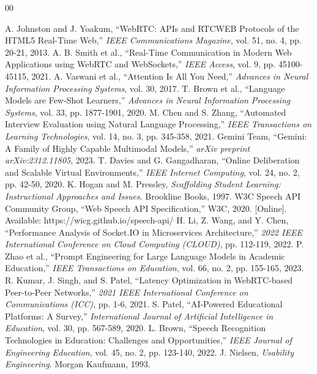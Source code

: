 \documentclass[conference]{IEEEtran}
\begin{document}
\begin{thebibliography}{00}

 A. Johnston and J. Yoakum, ``WebRTC: APIs and RTCWEB Protocols of the HTML5 Real-Time Web,'' \emph{IEEE Communications Magazine}, vol. 51, no. 4, pp. 20-21, 2013.
 A. B. Smith et al., ``Real-Time Communication in Modern Web Applications using WebRTC and WebSockets,'' \emph{IEEE Access}, vol. 9, pp. 45100-45115, 2021.
 A. Vaswani et al., ``Attention Is All You Need,'' \emph{Advances in Neural Information Processing Systems}, vol. 30, 2017.
 T. Brown et al., ``Language Models are Few-Shot Learners,'' \emph{Advances in Neural Information Processing Systems}, vol. 33, pp. 1877-1901, 2020.
 M. Chen and S. Zhang, ``Automated Interview Evaluation using Natural Language Processing,'' \emph{IEEE Transactions on Learning Technologies}, vol. 14, no. 3, pp. 345-358, 2021.
 Gemini Team, ``Gemini: A Family of Highly Capable Multimodal Models,'' \emph{arXiv preprint arXiv:2312.11805}, 2023.
 T. Davies and G. Gangadharan, ``Online Deliberation and Scalable Virtual Environments,'' \emph{IEEE Internet Computing}, vol. 24, no. 2, pp. 42-50, 2020.
 K. Hogan and M. Pressley, \emph{Scaffolding Student Learning: Instructional Approaches and Issues}. Brookline Books, 1997.
 W3C Speech API Community Group, ``Web Speech API Specification,'' W3C, 2020. [Online]. Available: https://wicg.github.io/speech-api/
 H. Li, Z. Wang, and Y. Chen, ``Performance Analysis of Socket.IO in Microservices Architecture,'' \emph{2022 IEEE International Conference on Cloud Computing (CLOUD)}, pp. 112-119, 2022.
 P. Zhao et al., ``Prompt Engineering for Large Language Models in Academic Education,'' \emph{IEEE Transactions on Education}, vol. 66, no. 2, pp. 155-165, 2023.
 R. Kumar, J. Singh, and S. Patel, ``Latency Optimization in WebRTC-based Peer-to-Peer Networks,'' \emph{2021 IEEE International Conference on Communications (ICC)}, pp. 1-6, 2021.
 S. Patel, ``AI-Powered Educational Platforms: A Survey,'' \emph{International Journal of Artificial Intelligence in Education}, vol. 30, pp. 567-589, 2020.
 L. Brown, ``Speech Recognition Technologies in Education: Challenges and Opportunities,'' \emph{IEEE Journal of Engineering Education}, vol. 45, no. 2, pp. 123-140, 2022.
 J. Nielsen, \emph{Usability Engineering}. Morgan Kaufmann, 1993.

\end{thebibliography}
\end{document}
